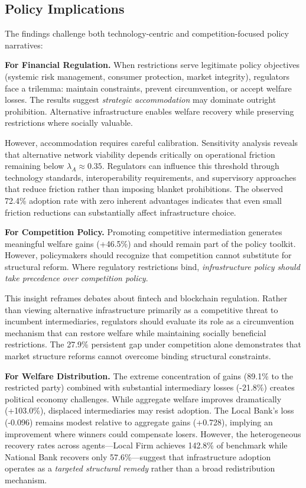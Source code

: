 \documentclass[12pt]{article}
\begin{document}
\subsection{Policy Implications}

The findings challenge both technology-centric and competition-focused policy narratives:

\textbf{For Financial Regulation.} When restrictions serve legitimate policy objectives (systemic risk management, consumer protection, market integrity), regulators face a trilemma: maintain constraints, prevent circumvention, or accept welfare losses. The results suggest \textit{strategic accommodation} may dominate outright prohibition. Alternative infrastructure enables welfare recovery while preserving restrictions where socially valuable.

However, accommodation requires careful calibration. Sensitivity analysis reveals that alternative network viability depends critically on operational friction remaining below $\lambda_A \approx 0.35$. Regulators can influence this threshold through technology standards, interoperability requirements, and supervisory approaches that reduce friction rather than imposing blanket prohibitions. The observed 72.4\% adoption rate with zero inherent advantages indicates that even small friction reductions can substantially affect infrastructure choice.

\textbf{For Competition Policy.} Promoting competitive intermediation generates meaningful welfare gains (+46.5\%) and should remain part of the policy toolkit. However, policymakers should recognize that competition cannot substitute for structural reform. Where regulatory restrictions bind, \textit{infrastructure policy should take precedence over competition policy}.

This insight reframes debates about fintech and blockchain regulation. Rather than viewing alternative infrastructure primarily as a competitive threat to incumbent intermediaries, regulators should evaluate its role as a circumvention mechanism that can restore welfare while maintaining socially beneficial restrictions. The 27.9\% persistent gap under competition alone demonstrates that market structure reforms cannot overcome binding structural constraints.

\textbf{For Welfare Distribution.} The extreme concentration of gains (89.1\% to the restricted party) combined with substantial intermediary losses (-21.8\%) creates political economy challenges. While aggregate welfare improves dramatically (+103.0\%), displaced intermediaries may resist adoption. The Local Bank's loss (-0.096) remains modest relative to aggregate gains (+0.728), implying an improvement where winners could compensate losers. However, the heterogeneous recovery rates across agents---Local Firm achieves 142.8\% of benchmark while National Bank recovers only 57.6\%---suggest that infrastructure adoption operates as a \textit{targeted structural remedy} rather than a broad redistribution mechanism.
\end{document}
